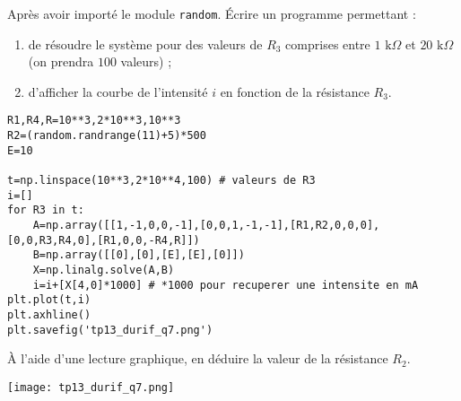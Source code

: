 \question{} Après avoir importé le module \texttt{random}. \'{E}crire un programme permettant :

				\begin{enumerate}
				\item de résoudre le système pour des valeurs de $R_3$ comprises entre $1\text{ k} \Omega$ et $20\text{ k} \Omega$ (on prendra $100$ valeurs) ;
				\item d'afficher la courbe de l'intensité $i$ en fonction de la résistance $R_3$.
				\end{enumerate}
				
\begin{lstlisting}
R1,R4,R=10**3,2*10**3,10**3
R2=(random.randrange(11)+5)*500
E=10

t=np.linspace(10**3,2*10**4,100) # valeurs de R3
i=[]
for R3 in t:
    A=np.array([[1,-1,0,0,-1],[0,0,1,-1,-1],[R1,R2,0,0,0],[0,0,R3,R4,0],[R1,0,0,-R4,R]])
    B=np.array([[0],[0],[E],[E],[0]])
    X=np.linalg.solve(A,B)
    i=i+[X[4,0]*1000] # *1000 pour recuperer une intensite en mA
plt.plot(t,i)
plt.axhline()
plt.savefig('tp13_durif_q7.png')
\end{lstlisting}

\question{} \`{A} l'aide d'une lecture graphique, en déduire la valeur de la résistance $R_2$.

\begin{center}
\texttt{[image: tp13\_durif\_q7.png]}
\end{center}


